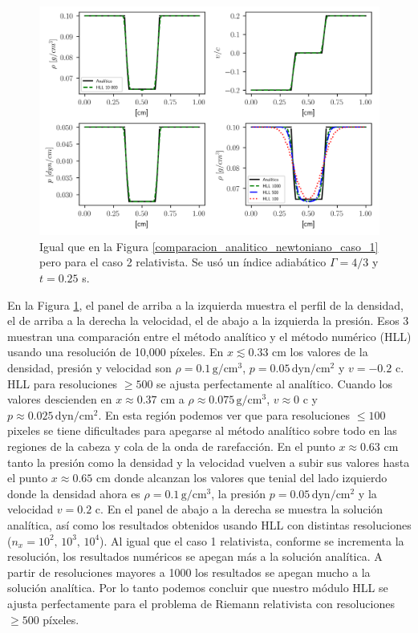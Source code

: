 \documentclass[12pt,a4paper]{book}
\begin{document}
\begin{figure}
  \centering
    \includegraphics[width=1.0\textwidth]{./Figuras/verificacion_del_codigo/caso_relativista/caso_rel_rar_rar.png}
  \caption{Igual que en la Figura \ref{comparacion_analitico_newtoniano_caso_1} pero para el caso 2 
  relativista. Se usó un índice adiabático $\Gamma = 4/3$ y $t = 0.25$ s.
  } \label{caso_rel_shock_shock_2}
\end{figure}

En la Figura \ref{caso_rel_shock_shock_2}, el panel de arriba a la izquierda muestra el perfil de la 
densidad, el de arriba a la derecha la velocidad, el de abajo a la izquierda la presión. Esos 3 muestran
una comparación entre el método analítico y el método numérico (HLL) usando una resolución de 
10,000 píxeles. 
En $x \lesssim 0.33$ cm los valores de la densidad, presión y velocidad son 
$\rho = 0.1 \,  \text{g}/ \text{cm}^3$, $p = 0.05 \,  \text{dyn}/ \text{cm}^2 $
y $v = -0.2$ c. HLL para resoluciones $\geq 500$ se ajusta perfectamente al analítico. Cuando los 
valores descienden en $x \approx 0.37$ cm a $\rho \approx 0.075 \,  \text{g}/ \text{cm}^3$, 
$v \approx 0$ c y $p \approx 0.025\,  \text{dyn}/ \text{cm}^2 $. En
esta región podemos ver que para resoluciones $\leq 100$ pixeles se tiene dificultades para apegarse al
método analítico sobre todo en las regiones de la cabeza y cola de la onda de rarefacción. En el punto $x \approx 0.63$  cm tanto la presión como la densidad y la velocidad vuelven a subir
sus valores hasta el punto $x \approx 0.65$ cm donde alcanzan los valores que tenial del lado izquierdo
donde la densidad ahora es $\rho = 0.1 \,  \text{g}/ \text{cm}^3$, la presión $p = 0.05 \,  \text{dyn}/ \text{cm}^2 $ 
y la velocidad $v = 0.2$ c.
En el panel de abajo a la derecha se muestra la solución analítica, así como los resultados obtenidos 
usando HLL con distintas resoluciones ($n_x = 10^2, \, 10^3, \,10^4$). 
Al igual que el caso 1 relativista,
conforme se incrementa la resolución, los resultados numéricos se apegan más a la solución analítica.
A partir de resoluciones mayores a 1000 los resultados se apegan mucho a la solución analítica.
Por lo tanto podemos concluir que nuestro módulo HLL se ajusta perfectamente para el problema de 
Riemann relativista con resoluciones $\geq 500$ píxeles.
\end{document}
